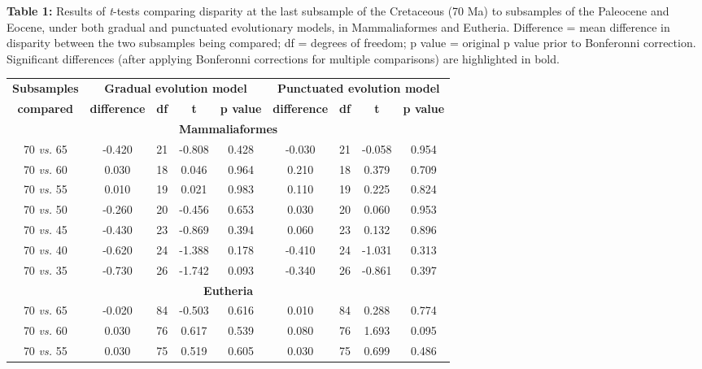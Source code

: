 \documentclass[12pt,letterpaper]{article}
\begin{document}
\newpage

\noindent
\textbf{Table 1:} Results of \textit{t}-tests comparing disparity at the last subsample of the Cretaceous (70 Ma) to subsamples of the Paleocene and Eocene, under both gradual and punctuated evolutionary models, in Mammaliaformes and Eutheria. Difference = mean difference in disparity between the two subsamples being compared; df = degrees of freedom; p value = original p value prior to Bonferonni correction. Significant differences (after applying Bonferonni corrections for multiple comparisons) are highlighted in bold.


\begin{table}[ht]
\centering
\begin{tabular}{c|cccc|cccc}
  \hline
  \textbf{Subsamples} & \multicolumn{4}{c|}{\textbf{Gradual evolution model}} & \multicolumn{4}{c}{\textbf{Punctuated evolution model}} \\
  \textbf{compared} & \textbf{difference} & \textbf{df} & \textbf{t} & \textbf{p value} & \textbf{difference} & \textbf{df} & \textbf{t} & \textbf{p value} \\ 
  \hline
  \multicolumn{9}{c}{\textbf{Mammaliaformes}}\\
  \hline
  70 \textit{vs.} 65 & -0.420 & 21 & -0.808 & 0.428 & -0.030 & 21 & -0.058 & 0.954 \\ 
  70 \textit{vs.} 60 & 0.030 & 18 & 0.046 & 0.964 & 0.210 & 18 & 0.379 & 0.709 \\ 
  70 \textit{vs.} 55 & 0.010 & 19 & 0.021 & 0.983 & 0.110 & 19 & 0.225 & 0.824 \\ 
  70 \textit{vs.} 50 & -0.260 & 20 & -0.456 & 0.653 & 0.030 & 20 & 0.060 & 0.953 \\ 
  70 \textit{vs.} 45 & -0.430 & 23 & -0.869 & 0.394 & 0.060 & 23 & 0.132 & 0.896 \\ 
  70 \textit{vs.} 40 & -0.620 & 24 & -1.388 & 0.178 & -0.410 & 24 & -1.031 & 0.313 \\ 
  70 \textit{vs.} 35 & -0.730 & 26 & -1.742 & 0.093 & -0.340 & 26 & -0.861 & 0.397 \\ 
  \hline
  \multicolumn{9}{c}{\textbf{Eutheria}}\\
  \hline
  70 \textit{vs.} 65 & -0.020 & 84 & -0.503 & 0.616 & 0.010 & 84 & 0.288 & 0.774 \\ 
  70 \textit{vs.} 60 & 0.030 & 76 & 0.617 & 0.539 & 0.080 & 76 & 1.693 & 0.095 \\ 
  70 \textit{vs.} 55 & 0.030 & 75 & 0.519 & 0.605 & 0.030 & 75 & 0.699 & 0.486 \\ 

\end{tabular}
\end{table}
\end{document}
